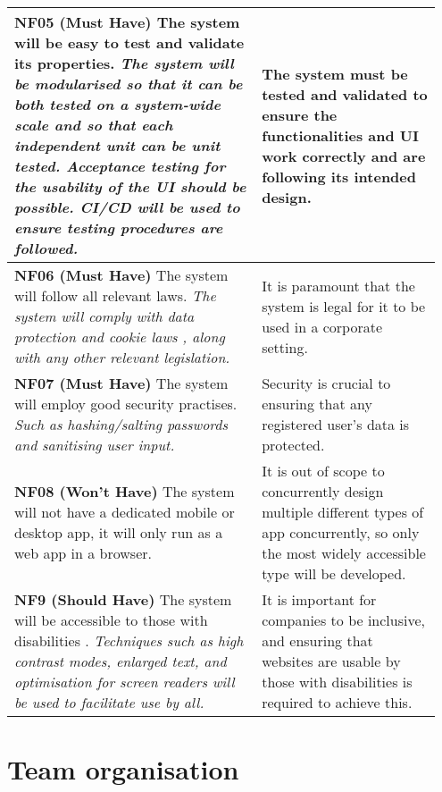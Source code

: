 \documentclass[10pt]{article}
\begin{document}
\begin{longtable}{|p{0.55\linewidth}|p{0.4\linewidth}|}
    \textbf{NF05 (Must Have) }
    The system will be easy to test and validate its properties.
    \textit{The system will be modularised so that it can be both tested on a
    system-wide scale and so that each independent unit can be unit tested.
    Acceptance testing for the usability of the UI should be possible.
    CI/CD will be used to ensure testing procedures are followed.}
        &
    The system must be tested and validated to ensure the functionalities and UI
    work correctly and are following its intended design.
    \\ \hline

    \textbf{NF06 (Must Have) }
    The system will follow all relevant laws.
    \textit{The system will comply with data protection \cite{data_protection}
    and cookie laws \cite{cookie_law}, along with any other relevant
    legislation.}
        &
    It is paramount that the system is legal for it to be used in a corporate
    setting.
    \\ \hline

    \textbf{NF07 (Must Have) }
    The system will employ good security practises.
    \textit{Such as hashing/salting passwords and sanitising user input.}
        &
    Security is crucial to ensuring that any registered user's data is
    protected.
    \\ \hline

    \textbf{NF08 (Won't Have) }
    The system will not have a dedicated mobile or desktop app, it will only
    run as a web app in a browser.
        &
    It is out of scope to concurrently design multiple different types of app
    concurrently, so only the most widely accessible type will be developed.
    \\ \hline

    \textbf{NF9 (Should Have) }
    The system will be accessible to those with disabilities \cite{accessibility}.
    \textit{Techniques such as high contrast modes, enlarged text, and
    optimisation for screen readers will be used to facilitate use by all.}
        &
    It is important for companies to be inclusive, and ensuring that websites
    are usable by those with disabilities is required to achieve this.
    \\ \hline

\end{longtable}

\vspace{-4mm}\section{Team organisation}\vspace{-2mm}
\end{document}
